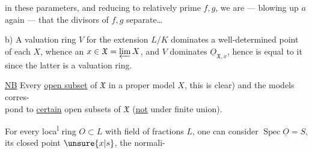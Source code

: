 
in these parameters, and reducing to relatively prime $f,g$, we are --- blowing up $a$ again --- that the divisors of $f,g$  separate\ldots

b) A valuation ring $V$  for the extension $L/K$ dominates a well-determined point  of each $X$, whence an $x\in\mathfrak X=\varprojlim X$, and $V$ dominates $\underline{O}_{\mathfrak X,x}$, hence is equal to it since the latter is a valuation ring.

\uline{NB} Every  \uline{open subset} of $\mathfrak X$    in a proper model $X$, this is clear) and  the models corres-\\
pond to \uline{certain} open subsets of $\mathfrak X$ (\uline{not}  under finite union).

For every  loca\textsuperscript{l} ring $O\subset L$ with field of fractions $L$, one can consider $\operatorname{Spec}\underline{O}=S$, its closed point $\unsure{x|s}$, the normali-

